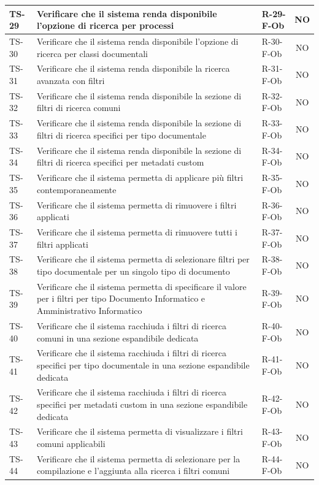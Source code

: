 \documentclass[a4paper,12pt]{article}
\begin{document}
\begin{longtable}{|p{1.5cm}|p{8.3cm}|p{2.4cm}|c|}
\hline
TS-29 & Verificare che il sistema renda disponibile l'opzione di ricerca per processi & R-29-F-Ob & NO \\
\hline
TS-30 & Verificare che il sistema renda disponibile l'opzione di ricerca per classi documentali & R-30-F-Ob & NO \\
\hline
TS-31 & Verificare che il sistema renda disponibile la ricerca avanzata con filtri & R-31-F-Ob & NO \\
\hline
TS-32 & Verificare che il sistema renda disponibile la sezione di filtri di ricerca comuni & R-32-F-Ob & NO \\
\hline
TS-33 & Verificare che il sistema renda disponibile la sezione di filtri di ricerca specifici per tipo documentale & R-33-F-Ob & NO \\
\hline
TS-34 & Verificare che il sistema renda disponibile la sezione di filtri di ricerca specifici per metadati custom & R-34-F-Ob & NO \\
\hline
TS-35 & Verificare che il sistema permetta di applicare più filtri contemporaneamente & R-35-F-Ob & NO \\
\hline
TS-36 & Verificare che il sistema permetta di rimuovere i filtri applicati & R-36-F-Ob & NO \\
\hline
TS-37 & Verificare che il sistema permetta di rimuovere tutti i filtri applicati & R-37-F-Ob & NO \\
\hline
TS-38 & Verificare che il sistema permetta di selezionare filtri per tipo documentale per un singolo tipo di documento & R-38-F-Ob & NO \\
\hline
TS-39 & Verificare che il sistema permetta di specificare il valore per i filtri per tipo Documento Informatico e Amministrativo Informatico & R-39-F-Ob & NO \\
\hline
TS-40 & Verificare che il sistema racchiuda i filtri di ricerca comuni in una sezione espandibile dedicata & R-40-F-Ob & NO \\
\hline
TS-41 & Verificare che il sistema racchiuda i filtri di ricerca specifici per tipo documentale in una sezione espandibile dedicata & R-41-F-Ob & NO \\
\hline
TS-42 & Verificare che il sistema racchiuda i filtri di ricerca specifici per metadati custom in una sezione espandibile dedicata & R-42-F-Ob & NO \\
\hline
TS-43 & Verificare che il sistema permetta di visualizzare i filtri comuni applicabili & R-43-F-Ob & NO \\
\hline
TS-44 & Verificare che il sistema permetta di selezionare per la compilazione e l'aggiunta alla ricerca i filtri comuni & R-44-F-Ob & NO \\

\end{longtable}
\end{document}

